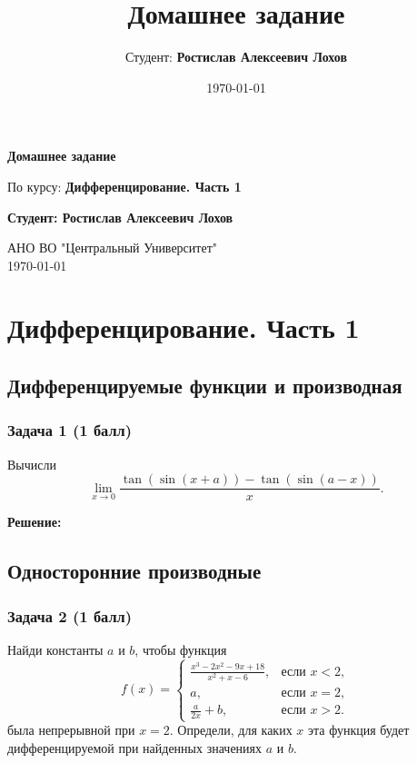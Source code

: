 \documentclass[a4paper,12pt]{article}
\title{Домашнее задание}
\author{Студент: \textbf{Ростислав Алексеевич Лохов}}
\date{\today}
\begin{document}
\begin{titlepage}
    \centering
    \vspace*{1cm}

    \Huge
    \textbf{Домашнее задание}

    \vspace{0.5cm}
    \LARGE
    По курсу: \textbf{Дифференцирование. Часть 1}

    \vspace{1.5cm}

    \textbf{Студент: Ростислав Алексеевич Лохов}

    \vfill

    \Large
    АНО ВО "Центральный Университет"\\
    \vspace{0.3cm}
    \today

\end{titlepage}

\tableofcontents
\newpage

\section{Дифференцирование. Часть 1}

\subsection{Дифференцируемые функции и производная}

\subsubsection{Задача 1 (1 балл)}
Вычисли
\[
\lim_{x \to 0} \frac{\tan(\sin(x + a)) - \tan(\sin(a - x))}{x}.
\]

\textbf{Решение:}


\vspace{1cm}

\subsection{Односторонние производные}

\subsubsection{Задача 2 (1 балл)}
Найди константы \( a \) и \( b \), чтобы функция
\[
f(x) =
\begin{cases}
\frac{x^3 - 2x^2 - 9x + 18}{x^2 + x - 6}, & \text{если } x < 2, \\
a, & \text{если } x = 2, \\
\frac{a}{2x} + b, & \text{если } x > 2.
\end{cases}
\]
была непрерывной при \( x = 2 \). Определи, для каких \( x \) эта функция будет дифференцируемой при найденных значениях \( a \) и \( b \).
\end{document}
